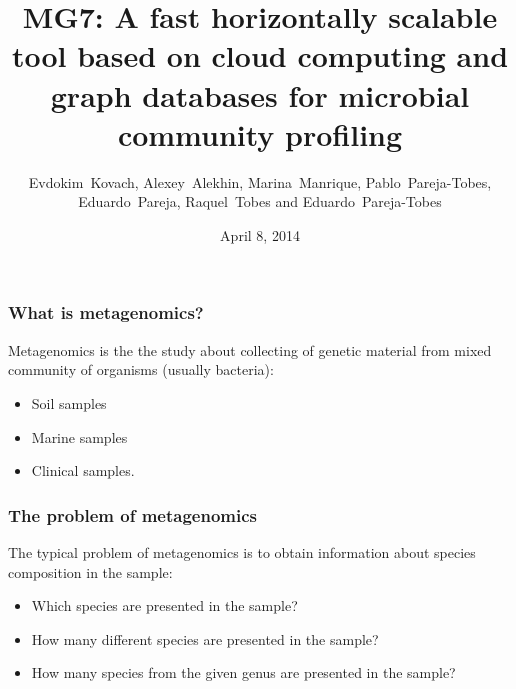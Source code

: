 \documentclass{beamer}
\title[MG7]{MG7: A fast horizontally scalable tool based on
cloud computing and graph databases for
microbial community profiling
} %
\author{Evdokim~Kovach, Alexey~Alekhin, Marina~Manrique, Pablo~Pareja-Tobes, Eduardo~Pareja, Raquel~Tobes and Eduardo~Pareja-Tobes} %
\institute[Era7] %
{
Oh no sequences! Research Group, Era7 bioinformatics
 \\ %
Granada, Spain
}
\date{April 8, 2014} %
\begin{document}
\begin{frame}
\titlepage %
\end{frame}





\begin{frame}
\frametitle{What is metagenomics?}

Metagenomics is the the study about collecting of genetic material from mixed community of organisms (usually bacteria):
\begin{itemize}
  \item Soil samples
  \item Marine samples
  \item Clinical samples.
\end{itemize}
\end{frame}

\begin{frame}
\frametitle{The problem of metagenomics}


The typical problem of metagenomics is to obtain information about species composition in the sample:
\begin{itemize}
  \item Which species are presented in the sample?
  \item How many different species are presented in the sample? 
  \item How many species from the given genus are presented in the sample?
\end{itemize}

\end{frame}
\end{document}
